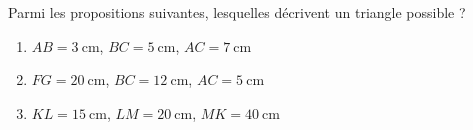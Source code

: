 
\begin{exercice}\label{exosmath-0850}

    Parmi les propositions suivantes, lesquelles décrivent un triangle possible ?
    \begin{enumerate}
        \item
            \( AB=\SI{3}{\centi\meter}\), \( BC=\SI{5}{\centi\meter}\), \( AC=\SI{7}{\centi\meter}\)
        \item
            \( FG=\SI{20}{\centi\meter}\), \( BC=\SI{12}{\centi\meter}\), \( AC=\SI{5}{\centi\meter}\)
        \item
            \( KL=\SI{15}{\centi\meter}\), \( LM=\SI{20}{\centi\meter}\), \( MK=\SI{40}{\centi\meter}\)
    \end{enumerate}

\end{exercice}
